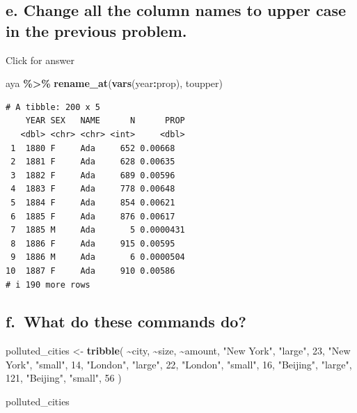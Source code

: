 \documentclass[
]{book}
\newenvironment{Shaded}{\begin{snugshade}}{\end{snugshade}}
\newcommand{\DecValTok}[1]{\textcolor[rgb]{0.00,0.00,0.81}{#1}}
\newcommand{\FunctionTok}[1]{\textcolor[rgb]{0.13,0.29,0.53}{\textbf{#1}}}
\newcommand{\NormalTok}[1]{#1}
\newcommand{\OtherTok}[1]{\textcolor[rgb]{0.56,0.35,0.01}{#1}}
\newcommand{\SpecialCharTok}[1]{\textcolor[rgb]{0.81,0.36,0.00}{\textbf{#1}}}
\newcommand{\StringTok}[1]{\textcolor[rgb]{0.31,0.60,0.02}{#1}}
\begin{document}
\hypertarget{e.-change-all-the-column-names-to-upper-case-in-the-previous-problem.}{%
\subsection{e. Change all the column names to upper case in the previous problem.}\label{e.-change-all-the-column-names-to-upper-case-in-the-previous-problem.}}

Click for answer

\begin{Shaded}
\begin{Highlighting}[]
\NormalTok{aya }\SpecialCharTok{\%\textgreater{}\%} \FunctionTok{rename\_at}\NormalTok{(}\FunctionTok{vars}\NormalTok{(year}\SpecialCharTok{:}\NormalTok{prop), toupper)}
\end{Highlighting}
\end{Shaded}

\begin{verbatim}
# A tibble: 200 x 5
    YEAR SEX   NAME      N      PROP
   <dbl> <chr> <chr> <int>     <dbl>
 1  1880 F     Ada     652 0.00668  
 2  1881 F     Ada     628 0.00635  
 3  1882 F     Ada     689 0.00596  
 4  1883 F     Ada     778 0.00648  
 5  1884 F     Ada     854 0.00621  
 6  1885 F     Ada     876 0.00617  
 7  1885 M     Ada       5 0.0000431
 8  1886 F     Ada     915 0.00595  
 9  1886 M     Ada       6 0.0000504
10  1887 F     Ada     910 0.00586  
# i 190 more rows
\end{verbatim}

\hypertarget{f.-what-do-these-commands-do}{%
\subsection{f.~What do these commands do?}\label{f.-what-do-these-commands-do}}

\begin{Shaded}
\begin{Highlighting}[]
\NormalTok{polluted\_cities }\OtherTok{\textless{}{-}} \FunctionTok{tribble}\NormalTok{(}
       \SpecialCharTok{\textasciitilde{}}\NormalTok{city,   }\SpecialCharTok{\textasciitilde{}}\NormalTok{size, }\SpecialCharTok{\textasciitilde{}}\NormalTok{amount, }
  \StringTok{"New York"}\NormalTok{, }\StringTok{"large"}\NormalTok{,      }\DecValTok{23}\NormalTok{,}
  \StringTok{"New York"}\NormalTok{, }\StringTok{"small"}\NormalTok{,      }\DecValTok{14}\NormalTok{,}
    \StringTok{"London"}\NormalTok{, }\StringTok{"large"}\NormalTok{,      }\DecValTok{22}\NormalTok{,}
    \StringTok{"London"}\NormalTok{, }\StringTok{"small"}\NormalTok{,      }\DecValTok{16}\NormalTok{,}
   \StringTok{"Beijing"}\NormalTok{, }\StringTok{"large"}\NormalTok{,      }\DecValTok{121}\NormalTok{,}
   \StringTok{"Beijing"}\NormalTok{, }\StringTok{"small"}\NormalTok{,      }\DecValTok{56}
\NormalTok{)}

\NormalTok{polluted\_cities}
\end{Highlighting}
\end{Shaded}
\end{document}
